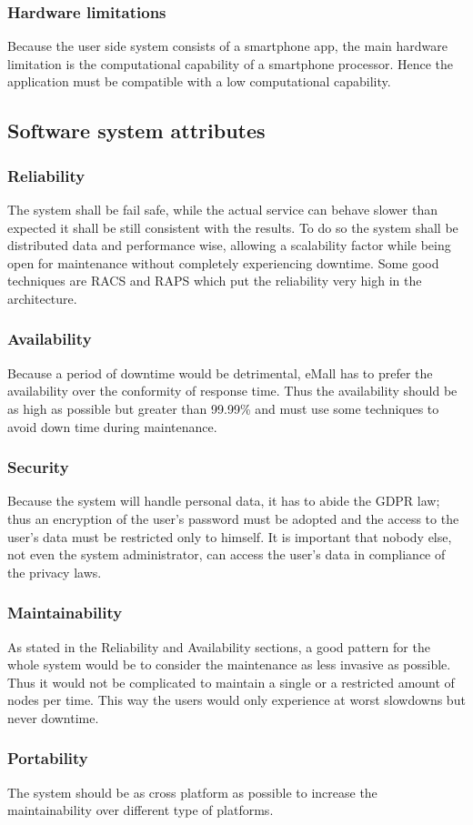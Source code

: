 \subsubsection{Hardware limitations}
Because the user side system consists of a smartphone app, the main hardware limitation is the computational capability of a smartphone processor. Hence the
application must be compatible with a low computational capability.

\subsection{Software system attributes}
\subsubsection{Reliability}
The system shall be fail safe, while the actual service can behave slower than expected it shall be still consistent with the results.
To do so the system shall be distributed data and performance wise, allowing a scalability factor while being open for maintenance without completely experiencing downtime.
Some good techniques are \ac{RACS} and \ac{RAPS} which put the reliability very high in the architecture.
\subsubsection{Availability}
Because a period of downtime would be detrimental, \ac{eMall} has to prefer the availability over the conformity of response time.
Thus the availability should be as high as possible but greater than 99.99\% and must use some techniques to avoid down time during maintenance.
\subsubsection{Security}
Because the system will handle personal data, it has to abide the \ac{GDPR} law; thus an encryption of the user's password must be adopted and the access to the user's data must be restricted only to himself.
It is important that nobody else, not even the system administrator, can access the user's data in compliance of the privacy laws.\\
\subsubsection{Maintainability}
As stated in the Reliability and Availability sections, a good pattern for the whole system would be to consider the maintenance as less invasive as possible. Thus it would not be complicated to maintain a single or a restricted amount of nodes per time. This way the users would only experience at worst slowdowns but never downtime.
\subsubsection{Portability}
The system should be as cross platform as possible to increase the maintainability over different type of platforms.
\clearpage